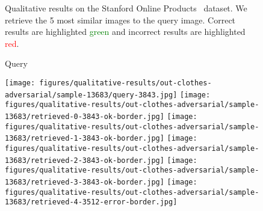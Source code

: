 \documentclass[10pt,journal,compsoc]{IEEEtran}
\begin{document}
\begin{figure*}[htbp]
\begin{center}
    \end{center}
    \caption{Qualitative results on the Stanford Online Products~\cite{oh2016deep} dataset. 
             We retrieve the 5 most similar images to the query image.
             Correct results are highlighted \textcolor{green}{green} and incorrect results are highlighted \textcolor{red}{red}.}
    \label{fig:qualitative-products}
\end{figure*}\begin{figure*}[htbp]
    \begin{center}
    \begin{minipage}{0.16\textwidth}
    \centering
    Query
    \end{minipage}
    \begin{minipage}{0.16\textwidth}
    \end{minipage}
    \begin{minipage}{0.16\textwidth}
    \end{minipage}
    \begin{minipage}{0.16\textwidth}
    \end{minipage}
    \begin{minipage}{0.16\textwidth}
    \end{minipage}
    \begin{minipage}{0.16\textwidth}
    \end{minipage}
    \hspace{0.5cm}

    \texttt{[image: figures/qualitative-results/out-clothes-adversarial/sample-13683/query-3843.jpg]}
    \texttt{[image: figures/qualitative-results/out-clothes-adversarial/sample-13683/retrieved-0-3843-ok-border.jpg]}
    \texttt{[image: figures/qualitative-results/out-clothes-adversarial/sample-13683/retrieved-1-3843-ok-border.jpg]}
    \texttt{[image: figures/qualitative-results/out-clothes-adversarial/sample-13683/retrieved-2-3843-ok-border.jpg]}
    \texttt{[image: figures/qualitative-results/out-clothes-adversarial/sample-13683/retrieved-3-3843-ok-border.jpg]}
    \texttt{[image: figures/qualitative-results/out-clothes-adversarial/sample-13683/retrieved-4-3512-error-border.jpg]}


\end{center}
\end{figure*}
\end{document}
